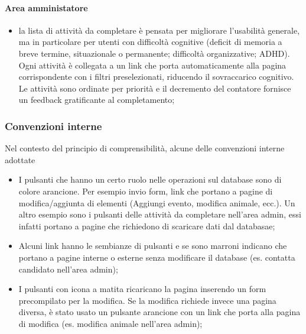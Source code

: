 \paragraph{Area amministatore}
\begin{itemize}
    \item la lista di attività da completare è pensata per migliorare l'usabilità generale, ma in particolare per utenti con difficoltà cognitive (deficit di memoria a breve termine, situazionale o permanente; difficoltà organizzative; ADHD). Ogni attività è collegata a un link che porta automaticamente alla pagina corrispondente con i filtri preselezionati, riducendo il sovraccarico cognitivo. Le attività sono ordinate per priorità e il decremento del contatore fornisce un feedback gratificante al completamento;
\end{itemize}
\subsubsection{Convenzioni interne}
Nel contesto del principio di comprensibilità, alcune delle convenzioni interne adottate
\begin{itemize}
    \item I pulsanti che hanno un certo ruolo nelle operazioni sul database sono di colore arancione. Per esempio invio form, link che portano a pagine di modifica/aggiunta di elementi (Aggiungi evento, modifica animale, ecc.). Un altro esempio sono i pulsanti delle attività da completare nell'area admin, essi infatti portano a pagine che richiedono di scaricare dati dal databasae;
    \item Alcuni link hanno le sembianze di pulsanti e se sono marroni indicano che portano a pagine interne o esterne senza modificare il database (es. contatta candidato nell'area admin);
    \item I pulsanti con icona a matita ricaricano la pagina inserendo un form precompilato per la modifica. Se la modifica richiede invece una pagina diversa, è stato usato un pulsante arancione con un link che porta alla pagina di modifica (es. modifica animale nell'area admin);
\end{itemize}


